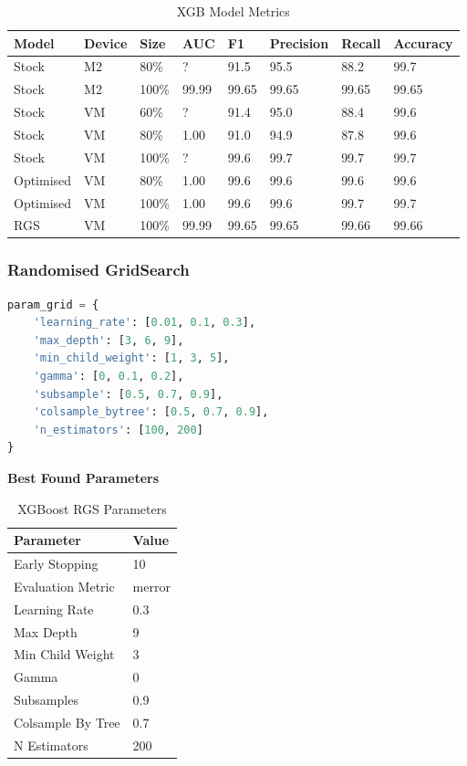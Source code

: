 \begin{table}[h]
\centering
\caption{XGB Model Metrics}
\label{tab:xgb-metrics}
\begin{tabular}{|l|l|l|l|l|l|l|l|}
\hline
\textbf{Model} & \textbf{Device} & \textbf{Size} & \textbf{AUC} & \textbf{F1} & \textbf{Precision} & \textbf{Recall} & \textbf{Accuracy} \\ \hline
Stock & M2 & 80\% & ? & 91.5 & 95.5 & 88.2 & 99.7 \\ \hline
Stock & M2 & 100\% & 99.99 & 99.65 & 99.65 & 99.65 & 99.65 \\ \hline
Stock & VM & 60\% & ? & 91.4 & 95.0 & 88.4 & 99.6 \\ \hline
Stock & VM & 80\% & 1.00 & 91.0 & 94.9 & 87.8 & 99.6 \\ \hline
Stock & VM & 100\% & ? & 99.6 & 99.7 & 99.7 & 99.7 \\ \hline
Optimised & VM & 80\% & 1.00 & 99.6 & 99.6 & 99.6 & 99.6 \\ \hline
Optimised & VM & 100\% & 1.00 & 99.6 & 99.6 & 99.7 & 99.7 \\ \hline
RGS & VM & 100\% & 99.99 & 99.65 & 99.65 & 99.66 & 99.66 \\ \hline
\end{tabular}
\end{table}



\subsubsection*{Randomised GridSearch}

\begin{lstlisting}[language=Python, caption={Parameter Gridsearch For XGBoost}]
param_grid = {
    'learning_rate': [0.01, 0.1, 0.3],
    'max_depth': [3, 6, 9],
    'min_child_weight': [1, 3, 5],
    'gamma': [0, 0.1, 0.2],
    'subsample': [0.5, 0.7, 0.9],
    'colsample_bytree': [0.5, 0.7, 0.9],
    'n_estimators': [100, 200]
}
\end{lstlisting}

\textbf{Best Found Parameters}
\medskip

\begin{table}[h]
\captionsetup{justification=centering} 
\centering
\caption{XGBoost RGS Parameters}
\begin{tabular}{ll}
\hline
\textbf{Parameter} & \textbf{Value} \\ \hline
Early Stopping & 10 \\
Evaluation Metric & merror \\
Learning Rate & 0.3 \\
Max Depth & 9 \\
Min Child Weight & 3 \\
Gamma & 0 \\
Subsamples & 0.9 \\
Colsample By Tree & 0.7 \\
N Estimators & 200 \\ \hline
\end{tabular}
\label{tab:xg_rgs_parameters}
\end{table}

